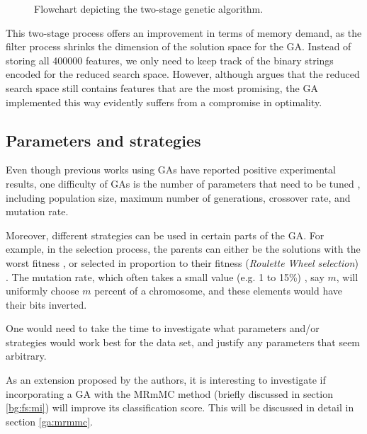 \documentclass[12pt, twoside, a4paper]{report}
\begin{document}
\begin{figure}
\centering
{}
\caption{Flowchart depicting the two-stage genetic algorithm.}
\label{bg:fs:ga:twoStage}
\end{figure}

This two-stage process offers an improvement in terms of memory demand, as the filter process shrinks the dimension of the solution space for the GA. Instead of storing all 400000 features, we only need to keep track of the binary strings encoded for the reduced search space. However, although \cite{RefWorks:201} argues that the reduced search space still contains features that are the most promising, the GA implemented this way evidently suffers from a compromise in optimality.

\subsection{Parameters and strategies}
Even though previous works using GAs have reported positive experimental results, one difficulty of GAs is the number of parameters that need to be tuned \cite{RefWorks:210}, including population size, maximum number of generations, crossover rate, and mutation rate.

Moreover, different strategies can be used in certain parts of the GA. For example, in the selection process, the parents can either be the solutions with the worst fitness \cite{RefWorks:203}, or selected in proportion to their fitness (\textit{Roulette Wheel selection}) \cite{RefWorks:205, RefWorks:227}. The mutation rate, which often takes a small value (e.g. 1 to 15\%) \cite{RefWorks:206}, say $m$, will uniformly choose $m$ percent of a chromosome, and these elements would have their bits inverted.

One would need to take the time to investigate what parameters and/or strategies would work best for the data set, and justify any parameters that seem arbitrary.

As an extension proposed by the authors, it is interesting to investigate if incorporating a GA with the MRmMC method (briefly discussed in section \ref{bg:fs:mi})  will improve its classification score. This will be discussed in detail in section \ref{ga:mrmmc}.
\end{document}

